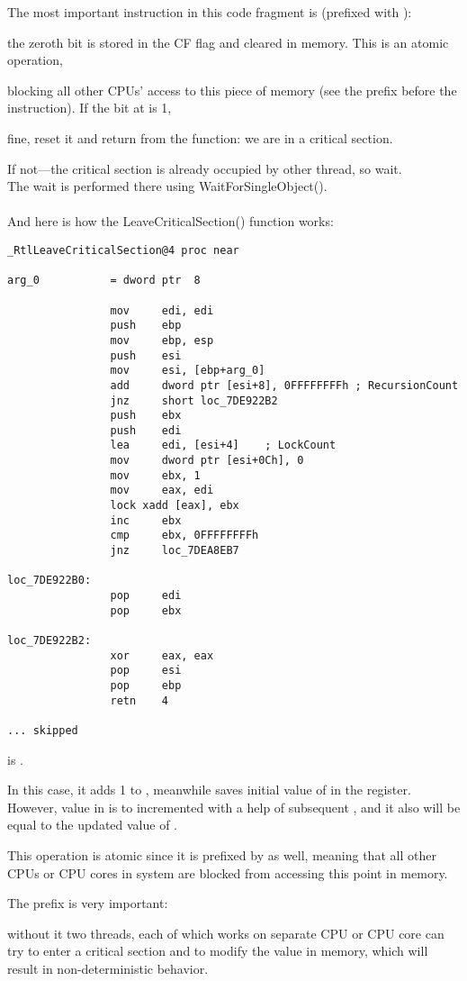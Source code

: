 
The most important instruction in this code fragment is  
(prefixed with ): 

the zeroth bit is stored in the CF flag and cleared in memory.
This is an \gls{atomic operation}, 

blocking all other CPUs' access to this piece of memory 
(see the  prefix before the  instruction).
If the bit at  is 1, 

fine, reset it and return from the function: we are in a critical section.

If not---the critical section is already occupied by other thread, so wait. \\
The wait is performed there using WaitForSingleObject(). \\
\\
And here is how the LeaveCriticalSection() function works:

\begin{lstlisting}[caption=Windows 2008/ntdll.dll/x86 (begin),style=customasmx86]
_RtlLeaveCriticalSection@4 proc near

arg_0           = dword ptr  8

                mov     edi, edi
                push    ebp
                mov     ebp, esp
                push    esi
                mov     esi, [ebp+arg_0]
                add     dword ptr [esi+8], 0FFFFFFFFh ; RecursionCount
                jnz     short loc_7DE922B2
                push    ebx
                push    edi
                lea     edi, [esi+4]    ; LockCount
                mov     dword ptr [esi+0Ch], 0
                mov     ebx, 1
                mov     eax, edi
                lock xadd [eax], ebx
                inc     ebx
                cmp     ebx, 0FFFFFFFFh
                jnz     loc_7DEA8EB7

loc_7DE922B0:
                pop     edi
                pop     ebx

loc_7DE922B2:
                xor     eax, eax
                pop     esi
                pop     ebp
                retn    4

... skipped
\end{lstlisting}

 is .

In this case, it adds 1 to , meanwhile saves initial value of  in the  register.
However, value in  is to incremented with a help of subsequent , and it also will be equal to
the updated value of .

This operation is atomic since it is prefixed by  as well,
meaning that all other CPUs or CPU cores in system are blocked from accessing this point in memory.

The  prefix is very important: 

without it two threads, each of which works on separate CPU or CPU core can try to
enter a critical section and to modify the value in memory,
which will result in non-deterministic behavior.


